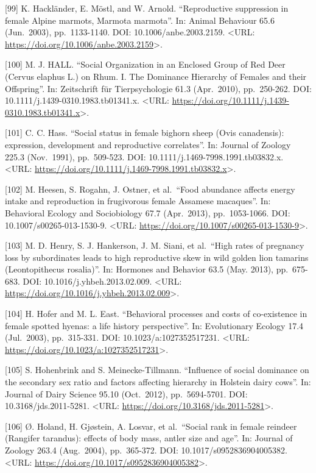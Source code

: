 \documentclass[
]{article}
\begin{document}
{[}99{]} K. Hackländer, E. Möstl, and W. Arnold. ``Reproductive
suppression in female Alpine marmots, Marmota marmota''. In: Animal
Behaviour 65.6 (Jun.~2003), pp.~1133-1140. DOI: 10.1006/anbe.2003.2159.
\textless URL: \url{https://doi.org/10.1006/anbe.2003.2159}\textgreater.

{[}100{]} M. J. HALL. ``Social Organization in an Enclosed Group of Red
Deer (Cervus elaphus L.) on Rhum. I. The Dominance Hierarchy of Females
and their Offspring''. In: Zeitschrift für Tierpsychologie 61.3
(Apr.~2010), pp.~250-262. DOI: 10.1111/j.1439-0310.1983.tb01341.x.
\textless URL:
\url{https://doi.org/10.1111/j.1439-0310.1983.tb01341.x}\textgreater.

{[}101{]} C. C. Hass. ``Social status in female bighorn sheep (Ovis
canadensis): expression, development and reproductive correlates''. In:
Journal of Zoology 225.3 (Nov.~1991), pp.~509-523. DOI:
10.1111/j.1469-7998.1991.tb03832.x. \textless URL:
\url{https://doi.org/10.1111/j.1469-7998.1991.tb03832.x}\textgreater.

{[}102{]} M. Heesen, S. Rogahn, J. Ostner, et al.~``Food abundance
affects energy intake and reproduction in frugivorous female Assamese
macaques''. In: Behavioral Ecology and Sociobiology 67.7 (Apr.~2013),
pp.~1053-1066. DOI: 10.1007/s00265-013-1530-9. \textless URL:
\url{https://doi.org/10.1007/s00265-013-1530-9}\textgreater.

{[}103{]} M. D. Henry, S. J. Hankerson, J. M. Siani, et al.~``High rates
of pregnancy loss by subordinates leads to high reproductive skew in
wild golden lion tamarins (Leontopithecus rosalia)''. In: Hormones and
Behavior 63.5 (May. 2013), pp.~675-683. DOI:
10.1016/j.yhbeh.2013.02.009. \textless URL:
\url{https://doi.org/10.1016/j.yhbeh.2013.02.009}\textgreater.

{[}104{]} H. Hofer and M. L. East. ``Behavioral processes and costs of
co-existence in female spotted hyenas: a life history perspective''. In:
Evolutionary Ecology 17.4 (Jul.~2003), pp.~315-331. DOI:
10.1023/a:1027352517231. \textless URL:
\url{https://doi.org/10.1023/a:1027352517231}\textgreater.

{[}105{]} S. Hohenbrink and S. Meinecke-Tillmann. ``Influence of social
dominance on the secondary sex ratio and factors affecting hierarchy in
Holstein dairy cows''. In: Journal of Dairy Science 95.10 (Oct.~2012),
pp.~5694-5701. DOI: 10.3168/jds.2011-5281. \textless URL:
\url{https://doi.org/10.3168/jds.2011-5281}\textgreater.

{[}106{]} Ø. Holand, H. Gjøstein, A. Losvar, et al.~``Social rank in
female reindeer (Rangifer tarandus): effects of body mass, antler size
and age''. In: Journal of Zoology 263.4 (Aug.~2004), pp.~365-372. DOI:
10.1017/s0952836904005382. \textless URL:
\url{https://doi.org/10.1017/s0952836904005382}\textgreater.
\end{document}
